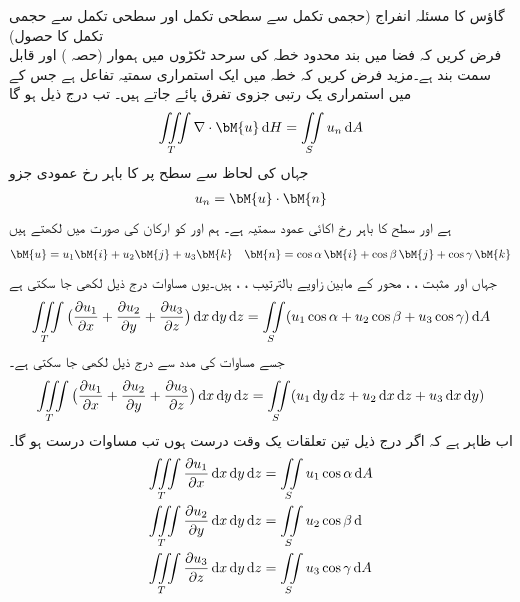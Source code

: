 \quad گاؤس کا مسئلہ انفراج (حجمی تکمل سے سطحی تکمل اور سطحی تکمل سے حجمی تکمل کا حصول)\\
فرض کریں کہ فضا میں بند محدود خطہ  کی سرحد  ٹکڑوں میں ہموار (حصہ ) اور قابل سمت بند ہے۔مزید فرض کریں کہ خطہ  میں  ایک استمراری سمتیہ  تفاعل ہے جس کے  میں استمراری یک رتبی جزوی تفرق پائے جاتے ہیں۔ تب درج ذیل ہو گا
\begin{align}\label{مساوات_خطی_تکمل_مسئلہ_گاوس_الف}
\iiint\limits_T \nabla \cdot \bM{u}\dif H=\iint\limits_S u_n\dif A
\end{align}
جہاں  کی لحاظ سے سطح  پر  کا باہر رخ عمودی جزو
\begin{align}\label{مساوات_خطی_تکمل_مسئلہ_گاوس_ب}
u_n=\bM{u}\cdot \bM{n}
\end{align}
ہے اور  سطح  کا باہر رخ  اکائی عمود سمتیہ ہے۔
ہم  اور  کو ارکان کی صورت میں لکھتے ہیں
\begin{align*}
\bM{u}=u_1\bM{i}+u_2\bM{j}+u_3\bM{k} \quad \bM{n}=\cos \alpha \,\bM{i}+\cos \beta \,\bM{j}+\cos \gamma\,\bM{k} 
\end{align*}
جہاں  اور مثبت ، ، محور  کے مابین زاویے بالترتیب ، ،  ہیں۔یوں مساوات  درج ذیل لکھی جا سکتی ہے
\begin{align}\label{مساوات_خطی_تکمل_مسئلہ_گاوس_پ}
\iiint\limits_T \big(\frac{\partial u_1}{\partial x}+\frac{\partial u_2}{\partial y}+\frac{\partial u_3}{\partial z}\big)\dif x\dif y\dif z=\iint\limits_S (u_1\cos \alpha+u_2\cos \beta+u_3\cos \gamma)\dif A
\end{align}
جسے مساوات  کی مدد سے درج ذیل لکھی جا سکتی ہے۔
\begin{align}\label{مساوات_خطی_تکمل_مسئلہ_گاوس_ت}
\iiint\limits_T \big(\frac{\partial u_1}{\partial x}+\frac{\partial u_2}{\partial y}+\frac{\partial u_3}{\partial z}\big)\dif x\dif y\dif z=\iint\limits_S (u_1\dif y\dif z+u_2\dif x\dif z +u_3\dif x\dif y)
\end{align}
اب ظاہر ہے کہ اگر درج ذیل تین تعلقات یک وقت درست ہوں تب مساوات  درست ہو گا۔
\begin{align}
\iiint\limits_T \frac{\partial u_1}{\partial x}\dif x\dif y\dif z&=\iint\limits_S u_1\cos \alpha \dif A \label{مساوات_خطی_تکمل_مسئلہ_گاوس_ٹ}\\
\iiint\limits_T \frac{\partial u_2}{\partial y}\dif x\dif y\dif z&=\iint\limits_S u_2\cos \beta \dif \label{مساوات_خطی_تکمل_مسئلہ_گاوس_ث}\\
\iiint\limits_T \frac{\partial u_3}{\partial z}\dif x\dif y\dif z&=\iint\limits_S u_3\cos \gamma \dif A\label{مساوات_خطی_تکمل_مسئلہ_گاوس_ج}
\end{align}

